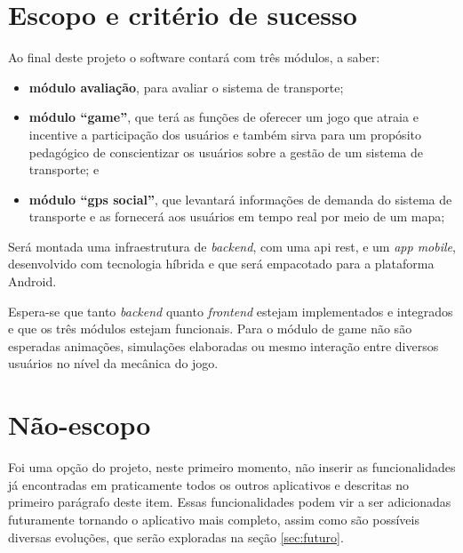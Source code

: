 \section{Escopo e critério de sucesso}\label{sec:Escopo}
	Ao final deste projeto o software contará com três módulos, a saber:
	\begin{itemize}%
		\item \textbf{módulo avaliação}, para avaliar o sistema de transporte;
		\item \textbf{módulo ``game''}, que terá as funções de oferecer um jogo que atraia e incentive a participação dos usuários e também sirva para um propósito pedagógico de conscientizar os usuários sobre a gestão de um sistema de transporte; e
		\item \textbf{módulo ``gps social''}, que levantará informações de demanda do sistema de transporte e as fornecerá aos usuários em tempo real por meio de um mapa;
	\end{itemize}
Será montada uma infraestrutura de \textit{backend}, com uma \gls{api} \gls{rest}, e um \textit{app mobile}, desenvolvido com tecnologia híbrida e que será empacotado para a plataforma Android.

Espera-se que tanto \textit{backend} quanto \textit{frontend} estejam implementados e integrados e que os três módulos estejam funcionais. Para o módulo de game não são esperadas animações, simulações elaboradas ou mesmo interação entre diversos usuários no nível da mecânica do jogo.

\section{Não-escopo}\label{sec:NãoEscopo}
Foi uma opção do projeto, neste primeiro momento, não inserir as funcionalidades já encontradas em praticamente todos os outros aplicativos e descritas no primeiro parágrafo deste item. Essas funcionalidades podem vir a ser adicionadas futuramente tornando o aplicativo mais completo, assim como são possíveis diversas evoluções, que serão exploradas na seção \ref{sec:futuro}.

